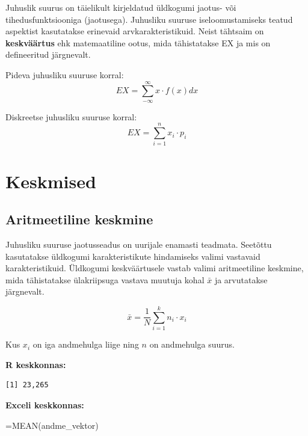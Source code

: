 \documentclass[
]{book}
\newenvironment{Shaded}{\begin{snugshade}}{\end{snugshade}}
\newcommand{\CommentTok}[1]{\textcolor[rgb]{0.56,0.35,0.01}{\textit{#1}}}
\newcommand{\FunctionTok}[1]{\textcolor[rgb]{0.13,0.29,0.53}{\textbf{#1}}}
\newcommand{\NormalTok}[1]{#1}
\newcommand{\OtherTok}[1]{\textcolor[rgb]{0.56,0.35,0.01}{#1}}
\newcommand{\SpecialCharTok}[1]{\textcolor[rgb]{0.81,0.36,0.00}{\textbf{#1}}}
\newcommand{\StringTok}[1]{\textcolor[rgb]{0.31,0.60,0.02}{#1}}
\renewenvironment{Shaded} {\begin{snugshade}\footnotesize} {\end{snugshade}}
\begin{document}
Juhuslik suurus on täielikult kirjeldatud üldkogumi jaotus- või tihedusfunktsiooniga (jaotusega). Juhusliku suuruse iseloomustamiseks teatud aspektist kasutatakse erinevaid arvkarakteristikuid. Neist tähtsaim on \textbf{keskväärtus} ehk matemaatiline ootus, mida tähistatakse EX ja mis on defineeritud järgnevalt.

Pideva juhusliku suuruse korral:
\[EX = \sum_{-\infty}^{\infty} x \cdot f(x) dx\]

Diskreetse juhusliku suuruse korral:
\[EX = \sum_{i=1}^{n} x_i \cdot p_i\]

\section{Keskmised}\label{keskmised}

\subsection{Aritmeetiline keskmine}\label{aritmeetiline-keskmine}

Juhusliku suuruse jaotusseadus on uurijale enamasti teadmata. Seetõttu kasutatakse üldkogumi karakteristikute hindamiseks valimi vastavaid karakteristikuid. Üldkogumi keskväärtusele vastab valimi aritmeetiline keskmine, mida tähistatakse ülakriipsuga vastava muutuja kohal \(\bar x\) ja arvutatakse järgnevalt.

\[ \bar x=\frac{1}{N}\sum_{i=1}^{k}n_i \cdot x_i \]

Kus \(x_{i}\) on iga andmehulga liige ning \(n\) on andmehulga suurus.

\textbf{R keskkonnas:}

\begin{Shaded}
\end{Shaded}

\begin{verbatim}
[1] 23,265
\end{verbatim}

\textbf{Exceli keskkonnas:}

\begin{naideExcel}
=MEAN(andme_vektor)

\end{naideExcel}
\end{document}
